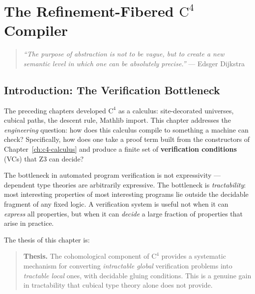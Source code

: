 %

\chapter{The Refinement-Fibered $\mathrm{C}^4$ Compiler}
\label{ch:c4-compiler}

\begin{quote}
\emph{``The purpose of abstraction is not to be vague, but to create
a new semantic level in which one can be absolutely precise.''}
--- Edsger Dijkstra
\end{quote}


\section{Introduction: The Verification Bottleneck}
\label{sec:compiler-intro}

The preceding chapters developed $\mathrm{C}^4$ as a calculus:
site-decorated universes, cubical paths, the descent rule,
Mathlib import.  This chapter addresses the \emph{engineering}
question: how does this calculus compile to something a machine
can check?  Specifically, how does one take a proof term built
from the constructors of Chapter~\ref{ch:c4-calculus} and produce
a finite set of \textbf{verification conditions} (VCs) that
Z3 can decide?

The bottleneck in automated program verification is not expressivity
--- dependent type theories are arbitrarily expressive.  The
bottleneck is \emph{tractability}: most interesting properties of
most interesting programs lie outside the decidable fragment of any
fixed logic.  A verification system is useful not when it can
\emph{express} all properties, but when it can \emph{decide} a
large fraction of properties that arise in practice.

The thesis of this chapter is:

\begin{quote}
\textbf{Thesis.}
The cohomological component of $\mathrm{C}^4$ provides a systematic
mechanism for converting \emph{intractable global} verification
problems into \emph{tractable local} ones, with decidable gluing
conditions.  This is a genuine gain in tractability that cubical
type theory alone does not provide.
\end{quote}

